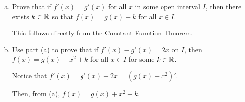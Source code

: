 \documentclass{agony}
\begin{document}
\begin{prob}
  \begin{enumerate}[(a)]
    \item Prove that if $f'(x) = g'(x)$ for all $x$ in some open interval $I$,
          then there exists $k \in \mathbb{R}$ so that $f(x) = g(x) + k$ for all $x \in I$.
          \begin{prf}
            This follows directly from the Constant Function Theorem.
          \end{prf}
    \item Use part (a) to prove that if $f'(x) - g'(x) = 2x$ on $I$,
          then $f(x) = g(x) + x^2 + k$ for all $x \in I$ for some $k \in \mathbb{R}$.
          \begin{prf}
            Notice that $f'(x) = g'(x) + 2x = (g(x)+x^2)'$.

            Then, from (a), $f(x) = g(x) + x^2 + k$.
          \end{prf}
  \end{enumerate}
\end{prob}
\end{document}
